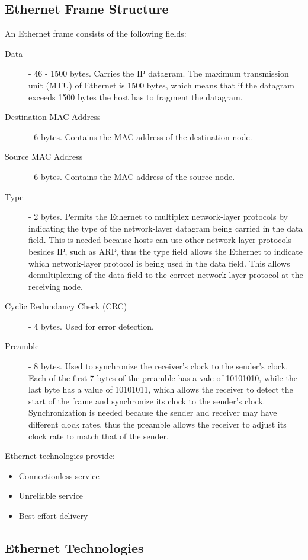 \documentclass[12pt letter]{report}
\begin{document}
\subsection{Ethernet Frame Structure}

An Ethernet frame consists of the following fields:
\begin{description}
  \item[Data]  - 46 - 1500 bytes. Carries the IP datagram. The
    maximum transmission unit (MTU) of Ethernet is 1500 bytes, which
    means that if the datagram exceeds 1500 bytes the host has to
    fragment the datagram.
  \item[Destination MAC Address] - 6 bytes. Contains the MAC address
    of the destination node.
  \item[Source MAC Address] - 6 bytes. Contains the MAC address of
    the source node.
  \item[Type] - 2 bytes. Permits the Ethernet to multiplex
    network-layer protocols by indicating the type of the
    network-layer datagram being carried in the data field. This is
    needed because hosts can use other network-layer protocols
    besides IP, such as ARP, thus the type field allows the Ethernet
    to indicate which network-layer protocol is being used in the
    data field. This allows demultiplexing of the data field to the
    correct network-layer protocol at the receiving node.
  \item[Cyclic Redundancy Check (CRC)] - 4 bytes. Used for error detection.
  \item[Preamble] - 8 bytes. Used to synchronize the receiver's clock
    to the sender's clock. Each of the first 7 bytes of the preamble
    has a vale of 10101010, while the last byte has a value of
    10101011, which allows the receiver to detect the start of the
    frame and synchronize its clock to the sender's clock.
    Synchronization is needed because the sender and receiver may
    have different clock rates, thus the preamble allows the receiver
    to adjust its clock rate to match that of the sender.
\end{description}

Ethernet technologies provide:
\begin{itemize}
  \item Connectionless service
  \item Unreliable service
  \item Best effort delivery
\end{itemize}

\subsection{Ethernet Technologies}
\end{document}
